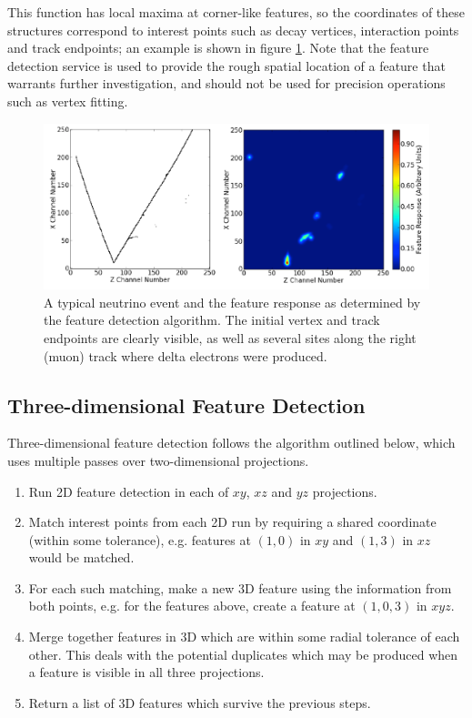 This function has local maxima at corner-like features, so the coordinates of these structures correspond to interest points such as decay vertices, interaction points and track endpoints; an example is shown in figure \ref{fig:feature-response}. Note that the feature detection service is used to provide the rough spatial location of a feature that warrants further investigation, and should not be used for precision operations such as vertex fitting.

\begin{figure}
    \includegraphics[width=\textwidth]{chapters/latte_images/feature-response}
    \caption[Feature response for a typical neutrino event]{\label{fig:feature-response}A typical neutrino event and the feature response as determined by the feature detection algorithm. The initial vertex and track endpoints are clearly visible, as well as several sites along the right (muon) track where delta electrons were produced.}
\end{figure}

\subsection{Three-dimensional Feature Detection}
Three-dimensional feature detection follows the algorithm outlined below, which uses multiple passes over two-dimensional projections.
\begin{enumerate}
    \item Run 2D feature detection in each of $xy$, $xz$ and $yz$ projections.
    \item Match interest points from each 2D run by requiring a shared coordinate (within some tolerance), e.g. features at $(1,0)$ in $xy$ and $(1,3)$ in $xz$ would be matched.
    \item For each such matching, make a new 3D feature using the information from both points, e.g. for the features above, create a feature at $(1,0,3)$ in $xyz$.
    \item Merge together features in 3D which are within some radial tolerance of each other. This deals with the potential duplicates which may be produced when a feature is visible in all three projections.
    \item Return a list of 3D features which survive the previous steps.
\end{enumerate}

